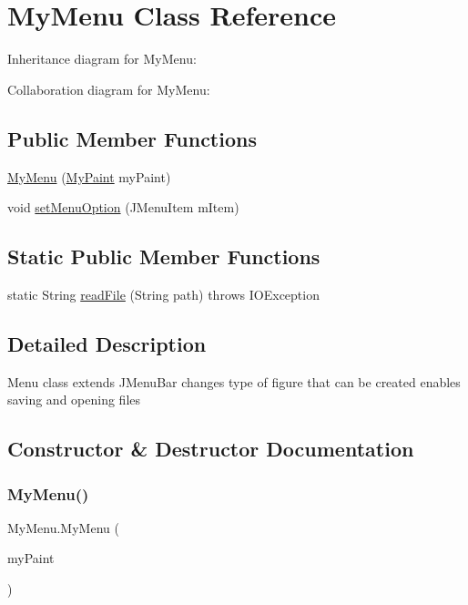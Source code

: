 \hypertarget{classMyMenu}{}\section{My\+Menu Class Reference}
\label{classMyMenu}


Inheritance diagram for My\+Menu\+:


Collaboration diagram for My\+Menu\+:
\subsection*{Public Member Functions}
\begin{DoxyCompactItemize}
\item 
\hyperlink{classMyMenu_a64ccf36f2ef35ebb02a4dcac3ae8ea03}{My\+Menu} (\hyperlink{classMyPaint}{My\+Paint} my\+Paint)
\item 
void \hyperlink{classMyMenu_a8420816b90a535a554eead927c40ef95}{set\+Menu\+Option} (J\+Menu\+Item m\+Item)
\end{DoxyCompactItemize}
\subsection*{Static Public Member Functions}
\begin{DoxyCompactItemize}
\item 
static String \hyperlink{classMyMenu_a76a17ad2e9001ae8d7caf0ff62eb2d37}{read\+File} (String path)  throws I\+O\+Exception 
\end{DoxyCompactItemize}


\subsection{Detailed Description}
Menu class extends J\+Menu\+Bar changes type of figure that can be created enables saving and opening files 

\subsection{Constructor \& Destructor Documentation}
\mbox{\label{classMyMenu_a64ccf36f2ef35ebb02a4dcac3ae8ea03}} 
\subsubsection{\texorpdfstring{My\+Menu()}{MyMenu()}}
{\footnotesize\ttfamily My\+Menu.\+My\+Menu (\begin{DoxyParamCaption}\item[{\hyperlink{classMyPaint}{My\+Paint}}]{my\+Paint }\end{DoxyParamCaption})\hspace{0.3cm}{\ttfamily [inline]}}

